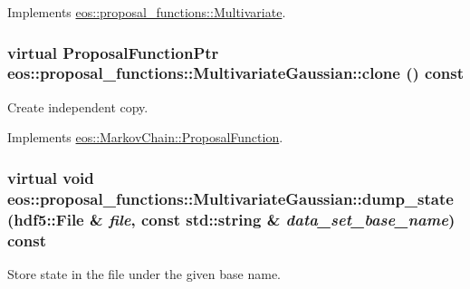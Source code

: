 Implements \hyperlink{classeos_1_1proposal__functions_1_1Multivariate_a284a17764a486687d3d1f2aee1a3bf3c}{eos::proposal\_\-functions::Multivariate}.\hypertarget{classeos_1_1proposal__functions_1_1MultivariateGaussian_abc989d0f246afe160eb1d4a0f1b4a03e}{
\subsubsection[{clone}]{\setlength{\rightskip}{0pt plus 5cm}virtual {\bf ProposalFunctionPtr} eos::proposal\_\-functions::MultivariateGaussian::clone () const}}
\label{classeos_1_1proposal__functions_1_1MultivariateGaussian_abc989d0f246afe160eb1d4a0f1b4a03e}


Create independent copy. 

Implements \hyperlink{structeos_1_1MarkovChain_1_1ProposalFunction_a7065079985f8bb44309d7773d85d225b}{eos::MarkovChain::ProposalFunction}.\hypertarget{classeos_1_1proposal__functions_1_1MultivariateGaussian_a5ab69304a64a9a947c847b8bc842417f}{
\subsubsection[{dump\_\-state}]{\setlength{\rightskip}{0pt plus 5cm}virtual void eos::proposal\_\-functions::MultivariateGaussian::dump\_\-state ({\bf hdf5::File} \& {\em file}, \/  const std::string \& {\em data\_\-set\_\-base\_\-name}) const}}
\label{classeos_1_1proposal__functions_1_1MultivariateGaussian_a5ab69304a64a9a947c847b8bc842417f}


Store state in the file under the given base name. 

